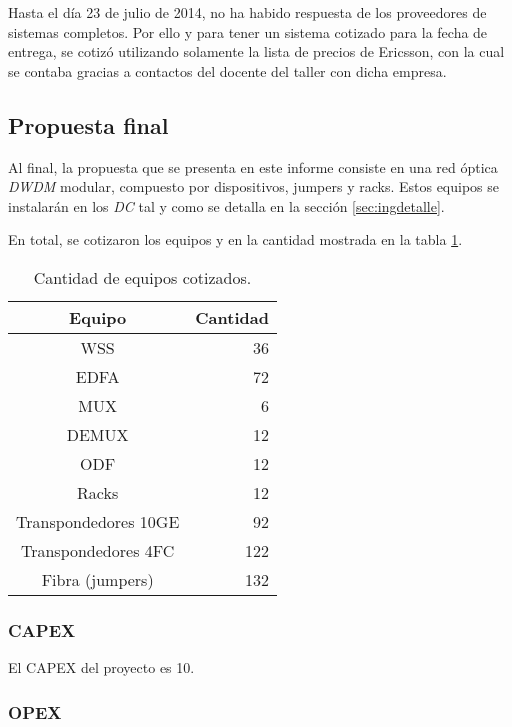 
Hasta el día 23 de julio de 2014, no ha habido respuesta de los
proveedores de sistemas completos. Por ello y para tener un sistema
cotizado para la fecha de entrega, se cotizó utilizando solamente la
lista de precios de Ericsson, con la cual se contaba gracias a
contactos del docente del taller con dicha empresa.

\subsection{Propuesta final}
\label{sec:ppfinal}

Al final, la propuesta que se presenta en este informe consiste en una
red óptica \emph{DWDM} modular, compuesto por dispositivos, jumpers y
racks. Estos equipos se instalarán en los \emph{DC} tal y como se
detalla en la sección \ref{sec:ingdetalle}.

En total, se cotizaron los equipos y en la cantidad mostrada en la
tabla \ref{tab:propfinal}.

\begin{table}[H]
  \centering
  \begin{tabular}{| c | r |}
    \hline
    Equipo & Cantidad \\
    \hline
    WSS & 36 \\
    EDFA & 72 \\
    MUX & 6 \\
    DEMUX & 12 \\
    ODF & 12 \\
    Racks & 12 \\
    Transpondedores 10GE & 92 \\
    Transpondedores 4FC & 122 \\
    Fibra (jumpers) & 132 \\
    \hline
  \end{tabular}
  \caption{Cantidad de equipos cotizados.}
  \label{tab:propfinal}
\end{table}

\subsubsection{CAPEX}
\label{sec:capex}

El CAPEX del proyecto es 10.

\subsubsection{OPEX}
\label{sec:opex}

